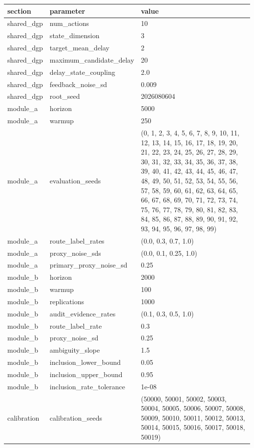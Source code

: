 \begin{tabular}{lll}
\toprule
section & parameter & value \\
\midrule
shared\_dgp & num\_actions & 10 \\
shared\_dgp & state\_dimension & 3 \\
shared\_dgp & target\_mean\_delay & 2 \\
shared\_dgp & maximum\_candidate\_delay & 20 \\
shared\_dgp & delay\_state\_coupling & 2.0 \\
shared\_dgp & feedback\_noise\_sd & 0.009 \\
shared\_dgp & root\_seed & 2026080604 \\
module\_a & horizon & 5000 \\
module\_a & warmup & 250 \\
module\_a & evaluation\_seeds & (0, 1, 2, 3, 4, 5, 6, 7, 8, 9, 10, 11, 12, 13, 14, 15, 16, 17, 18, 19, 20, 21, 22, 23, 24, 25, 26, 27, 28, 29, 30, 31, 32, 33, 34, 35, 36, 37, 38, 39, 40, 41, 42, 43, 44, 45, 46, 47, 48, 49, 50, 51, 52, 53, 54, 55, 56, 57, 58, 59, 60, 61, 62, 63, 64, 65, 66, 67, 68, 69, 70, 71, 72, 73, 74, 75, 76, 77, 78, 79, 80, 81, 82, 83, 84, 85, 86, 87, 88, 89, 90, 91, 92, 93, 94, 95, 96, 97, 98, 99) \\
module\_a & route\_label\_rates & (0.0, 0.3, 0.7, 1.0) \\
module\_a & proxy\_noise\_sds & (0.0, 0.1, 0.25, 1.0) \\
module\_a & primary\_proxy\_noise\_sd & 0.25 \\
module\_b & horizon & 2000 \\
module\_b & warmup & 100 \\
module\_b & replications & 1000 \\
module\_b & audit\_evidence\_rates & (0.1, 0.3, 0.5, 1.0) \\
module\_b & route\_label\_rate & 0.3 \\
module\_b & proxy\_noise\_sd & 0.25 \\
module\_b & ambiguity\_slope & 1.5 \\
module\_b & inclusion\_lower\_bound & 0.05 \\
module\_b & inclusion\_upper\_bound & 0.95 \\
module\_b & inclusion\_rate\_tolerance & 1e-08 \\
calibration & calibration\_seeds & (50000, 50001, 50002, 50003, 50004, 50005, 50006, 50007, 50008, 50009, 50010, 50011, 50012, 50013, 50014, 50015, 50016, 50017, 50018, 50019) \\

\end{tabular}
